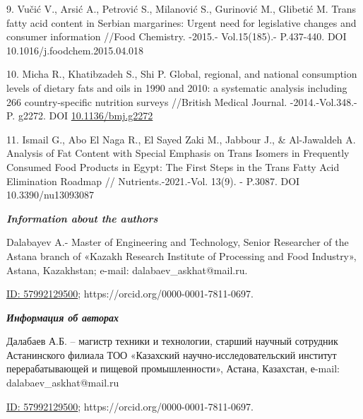 \begin{references}
9. Vučić V., Arsić A., Petrović S., Milanović S., Gurinović M., Glibetić
M. Trans fatty acid content in Serbian margarines: Urgent need for
legislative changes and consumer information //Food Chemistry. -2015.-
Vol.15(185).- P.437-440. DOI 10.1016/j.foodchem.2015.04.018

10. Micha R., Khatibzadeh S., Shi P. Global, regional, and national
consumption levels of dietary fats and oils in 1990 and 2010: a
systematic analysis including 266 country-specific nutrition surveys
//British Medical Journal. -2014.-Vol.348.-P. g2272. DOI
\href{https://doi.org/10.1136/bmj.g2272}{10.1136/bmj.g2272}

11. Ismail G., Abo El Naga R., El Sayed Zaki M., Jabbour J., \&
Al-Jawaldeh A. Analysis of Fat Content with Special Emphasis on Trans
Isomers in Frequently Consumed Food Products in Egypt: The First Steps
in the Trans Fatty Acid Elimination Roadmap // Nutrients.-2021.-Vol.
13(9). - P.3087. DOI 10.3390/nu13093087
\end{references}

\begin{authorinfo}
\emph{{\bfseries Information about the authors}}

Dalabayev A.- Master of Engineering and Technology, Senior Researcher of
the Astana branch of «Kazakh Research Institute of Processing and Food
Industry», Astana, Kazakhstan; e-mail:
dalabaev\_askhat@mail.ru.

\href{http://www.scopus.com/inward/authorDetails.url?authorID=56576301100&partnerID=MN8TOARS}{ID:
57992129500}; https://orcid.org/0000-0001-7811-0697.

\emph{{\bfseries Информация об авторах}}

Далабаев А.Б. -- магистр техники и технологии, старший научный сотрудник
Астанинского филиала ТОО «Казахский научно-исследовательский институт
перерабатывающей и пищевой промышленности», Астана, Казахстан, е-mail:
dalabaev\_askhat@mail.ru

\href{http://www.scopus.com/inward/authorDetails.url?authorID=56576301100&partnerID=MN8TOARS}{ID:
57992129500}; https://orcid.org/0000-0001-7811-0697.\
\end{authorinfo}
